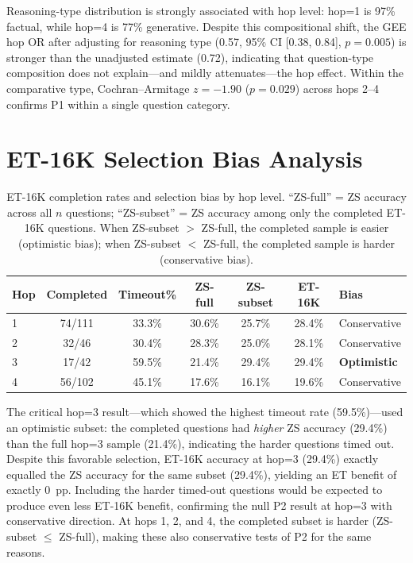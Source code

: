 \documentclass{article}
\begin{document}
Reasoning-type distribution is strongly associated with hop level: hop=1 is 97\%
factual, while hop=4 is 77\% generative. Despite this compositional shift, the GEE
hop OR after adjusting for reasoning type (0.57, 95\% CI [0.38, 0.84], $p = 0.005$)
is stronger than the unadjusted estimate (0.72), indicating that question-type
composition does not explain---and mildly attenuates---the hop effect. Within the
comparative type, Cochran--Armitage $z = -1.90$ ($p = 0.029$) across hops 2--4
confirms P1 within a single question category.

\section{ET-16K Selection Bias Analysis}
\label{app:et16k_bias}

\begin{table}[h]
\centering
\caption{ET-16K completion rates and selection bias by hop level. ``ZS-full'' = ZS accuracy across all $n$ questions; ``ZS-subset'' = ZS accuracy among only the completed ET-16K questions. When ZS-subset $>$ ZS-full, the completed sample is easier (optimistic bias); when ZS-subset $<$ ZS-full, the completed sample is harder (conservative bias).}
\label{tab:et16k_bias}
\small
\begin{tabular}{@{}lcccccl@{}}
\toprule
\textbf{Hop} & \textbf{Completed} & \textbf{Timeout\%} & \textbf{ZS-full} & \textbf{ZS-subset} & \textbf{ET-16K} & \textbf{Bias} \\
\midrule
1 & 74/111 & 33.3\% & 30.6\% & 25.7\% & 28.4\% & Conservative \\
2 & 32/46  & 30.4\% & 28.3\% & 25.0\% & 28.1\% & Conservative \\
3 & 17/42  & 59.5\% & 21.4\% & 29.4\% & 29.4\% & \textbf{Optimistic} \\
4 & 56/102 & 45.1\% & 17.6\% & 16.1\% & 19.6\% & Conservative \\
\bottomrule
\end{tabular}
\end{table}

The critical hop=3 result---which showed the highest timeout rate (59.5\%)---used
an optimistic subset: the completed questions had \emph{higher} ZS accuracy (29.4\%)
than the full hop=3 sample (21.4\%), indicating the harder questions timed out.
Despite this favorable selection, ET-16K accuracy at hop=3 (29.4\%) exactly equalled
the ZS accuracy for the same subset (29.4\%), yielding an ET benefit of exactly 0~pp.
Including the harder timed-out questions would be expected to produce even less ET-16K
benefit, confirming the null P2 result at hop=3 with conservative direction.
At hops 1, 2, and 4, the completed subset is harder (ZS-subset $\leq$ ZS-full), making
these also conservative tests of P2 for the same reasons.
\end{document}
